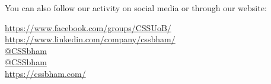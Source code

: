 \documentclass{article}
\begin{document}
\noindent You can also follow our activity on social media or through our website:
\medskip

\noindent\faFacebook  \hspace{0.3cm} \url{https://www.facebook.com/groups/CSSUoB/} \\
\noindent\hspace{1pt}\faLinkedin \hspace{3.5pt} \url{https://www.linkedin.com/company/cssbham/} \\
\noindent \faTwitter  \hspace{0.1cm} \href{https://twitter.com/cssbham}{@CSSbham} \\
\faInstagram  \hspace{0.1cm} \href{https://www.instagram.com/cssbham/}{@CSSbham} \\
\faMousePointer  \hspace{0.225cm} \url{https://cssbham.com/}
\end{document}
